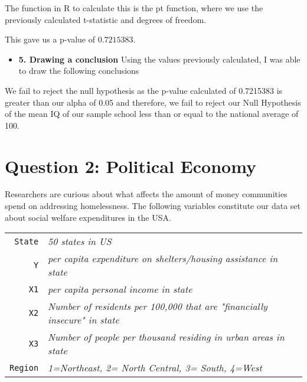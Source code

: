 \documentclass[12pt,letterpaper]{article}
\begin{document}
\begin{enumerate}
	The function in R to calculate this is the pt function, where we use the previously calculated t-statistic and degrees of freedom.
	
	
	This gave us a p-value of \(0.7215383\).
	
	\begin{itemize}
		\item \textbf{5. Drawing a conclusion} Using the values previously calculated, I was able to draw the following conclusions
	\end{itemize}
	
	We fail to reject the null hypothesis as the p-value calculated of 0.7215383 is greater than our alpha of 0.05 and therefore, we fail to reject our Null Hypothesis of the mean IQ of our sample school less than or equal to the national average of 100.

\end{enumerate}

\newpage

	\section*{Question 2: Political Economy}

\noindent Researchers are curious about what affects the amount of money communities spend on addressing homelessness. The following variables constitute our data set about social welfare expenditures in the USA. \\
\vspace{.5cm}


\begin{tabular}{r|l}
	\texttt{State} &\emph{50 states in US} \\
	\texttt{Y} & \emph{per capita expenditure on shelters/housing assistance in state}\\
	\texttt{X1} &\emph{per capita personal income in state} \\
	\texttt{X2} &  \emph{Number of residents per 100,000 that are "financially insecure" in state}\\
	\texttt{X3} &  \emph{Number of people per thousand residing in urban areas in state} \\
	\texttt{Region} &  \emph{1=Northeast, 2= North Central, 3= South, 4=West} \\
\end{tabular}
\end{document}
